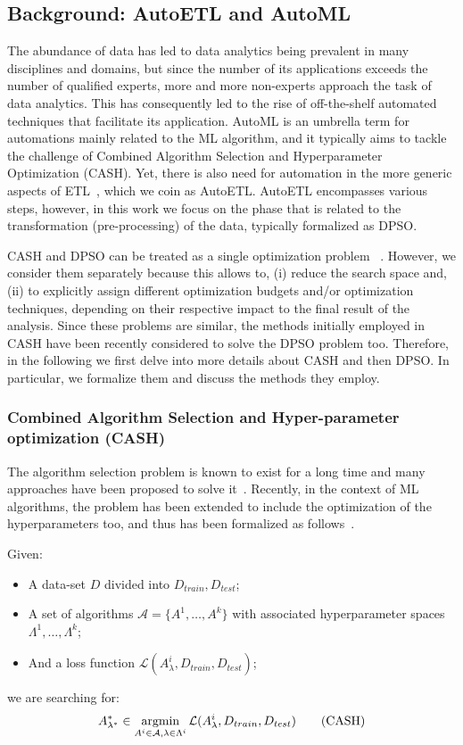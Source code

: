 \subsection{Background: AutoETL and AutoML}
\label{ssec:background}


The abundance of data has led to data analytics being prevalent in many disciplines and domains, but since the number of its applications exceeds the number of qualified experts, more and more non-experts approach the task of data analytics. This has consequently led to the rise of off-the-shelf automated techniques that facilitate its application.
AutoML is an umbrella term for automations mainly related to the ML algorithm, and it typically aims to tackle the challenge of Combined Algorithm Selection and Hyperparameter Optimization (CASH). Yet, there is also need for automation in the more generic aspects of ETL~\cite{Munoz09DOLAP}, which we coin as AutoETL. AutoETL encompasses various steps, however, in this work we focus on the phase that is related to the transformation (pre-processing) of the data, typically formalized as DPSO.

CASH and DPSO can be treated as a single optimization problem ~\cite{auto_weka, auto_sklearn}. However, we consider them separately because this allows to, (i) reduce the search space and, (ii) to explicitly assign different optimization budgets and/or optimization techniques, depending on their respective impact to the final result of the analysis.
Since these problems are similar, the methods initially employed in CASH have been recently considered to solve the DPSO problem too. Therefore, in the following we first delve into more details about CASH and then DPSO. In particular, we formalize them and discuss the methods they employ.

\subsubsection{Combined Algorithm Selection and Hyper-parameter optimization (CASH)}

The algorithm selection problem is known to exist for a long time and many approaches have been proposed to solve it~\cite{Serban13survey}. Recently, in the context of ML algorithms, the problem has been extended to include the optimization of the hyperparameters too, and thus has been formalized as follows~\cite{auto_weka}.

Given:
\begin{itemize}
    \item A data-set $D$ divided into $D_{train}, D_{test}$;
    \item A set of algorithms $\mathcal{A} = \{A^{1}, \dots , A^{k}\}$ with associated hyperparameter spaces $\Lambda^{1}, \dots, \Lambda^{k}$;
    \item And a loss function $\mathcal{L}(A^{i}_\lambda,D_{train},D_{test})$;
\end{itemize}
we are searching for:
\begin{equation}
    A^{\ast}_{\lambda^{\ast}} \in \mathop{\mathrm{argmin}}\limits_{A^i \in \mathcal{A}, \lambda \in \Lambda^i} \mathcal{L}(A^i_\lambda,D_{train},D_{test}) \tag{CASH}
\end{equation}


